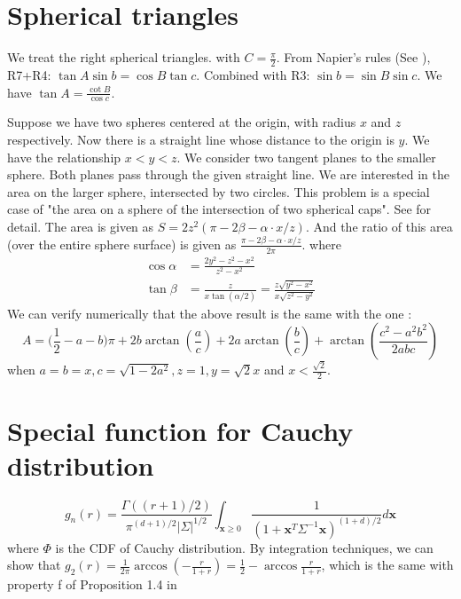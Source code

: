 \documentclass{article}
\begin{document}
\section{Spherical triangles}
We treat the  right spherical triangles. with $C=\frac{\pi}{2}$.
From Napier's rules
(See \cite{Napier}),
R7+R4: $\tan A \sin b = \cos B \tan c$.
Combined with R3: $\sin b = \sin B \sin c$.
We have $\tan A = \frac{\cot B}{\cos c}$.

Suppose we have two spheres centered at the origin, with radius $x$ and $z$ respectively.
Now there is a straight line whose distance to the origin is $y$.
We have the relationship $x<y<z$.
We consider two tangent planes to the smaller sphere.
Both planes pass through the given straight line.
We are interested in the area
on the larger sphere,
intersected by two circles.
This problem is a special case
of "the area on a sphere of the intersection of two spherical caps".
See \cite{intersection}
for detail.
The area is given as $S=2z^2(\pi - 2\beta - \alpha \cdot x/z)$.
And the ratio of this area (over the entire sphere surface)
is given as
$\frac{\pi - 2\beta - \alpha \cdot x/z}{2\pi}$.
where
\begin{align}
\cos \alpha & = \frac{2y^2 - z^2 - x^2}{
    z^2 - x^2 }\\
\tan \beta &= \frac{z}{ 
    x  \tan(\alpha/2)} = \frac{z \sqrt{y^2-x^2}}{x\sqrt{z^2-y^2}}
\end{align}
We can verify numerically that the above result is the same with 
the one \cite{orthogonal}:
\begin{equation}
    A=\big(\frac 12-a-b\big)\pi + 2b\arctan(\frac ac)+2a\arctan(\frac bc)+\arctan(\frac{c^2-a^2 b^2}{2abc})
\end{equation}
when $a=b=x, c=\sqrt{1-2a^2}, z=1,y=\sqrt{2}x$ and $x<\frac{\sqrt{2}}{2}$.
\section{Special function for Cauchy distribution}
\begin{equation}
    g_n(r) = \frac{\Gamma((r+1)/2)}{\pi^{(d+1)/2}|\Sigma|^{1/2}}
    \int_{\bm{x}\geq 0}\frac{1}{(1+\bm{x}^T\Sigma^{-1}\bm{x})^{(1+d)/2}}d\bm{x}
\end{equation}
where $\Phi$ is the CDF of Cauchy distribution.
By integration techniques, we can show that 
$g_2(r)=\frac{1}{2\pi}\arccos(-\frac{r}{1+r})
=\frac{1}{2}-\arccos\frac{r}{1+r}$,
which is the same with property f of Proposition 1.4 in \cite{kabluchko2020absorption}
\end{document}
